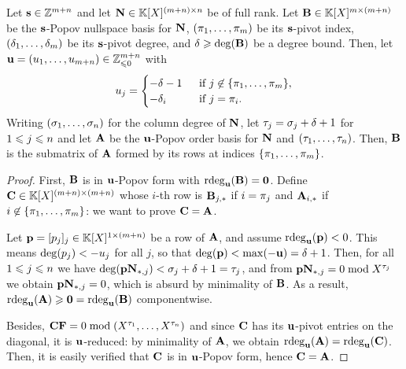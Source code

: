 \documentclass[preprint]{sig-alternate-05-2015}
\begin{document}
\vspace{-0.1cm}
\begin{lem}
  \label{lem:mnb_known_mindeg}
  Let $\shifts \in \shiftSpace[\rdim+\cdim]$ and let $\mat{N} \in
  \polMatSpace[(\rdim+\cdim)][\cdim]$ be of full rank. Let $\mat{B} \in
  \polMatSpace[\rdim][(\rdim+\cdim)]$ be the $\shifts$-Popov nullspace basis
  for $\mat{N}$, $(\piv_1,\ldots,\piv_\rdim)$ be its $\shifts$-pivot index,
  $(\minDeg_1,\ldots,\minDeg_\rdim)$ be its $\shifts$-pivot degree, and
  $\maxDeg \ge \deg(\mat{B})$ be a degree bound. Then, let $\shifts[u] =
  (\shift[u]{1}, \ldots, \shift[u]{\rdim+\cdim}) \in \ZZ_{\le 0}^{\rdim+\cdim}$
  with 
  \vspace{-0.2cm}
  \[ \shift[u]{j} = \begin{cases} 
      -\maxDeg -1 & \;\; \text{if } j \not\in \{\piv_1,\ldots,\piv_\rdim\}, \\ 
      -\minDeg_i & \;\; \text{if } j = \piv_i.
    \end{cases}
  \vspace{-0.2cm}
  \]
  Writing $(\order_1,\ldots,\order_\cdim)$ for the column degree of $\mat{N}$,
  let $\tau_j = \order_j + \maxDeg +1$ for $1 \le j \le \cdim$ and let
  $\mat{A}$ be the $\shifts[u]$-Popov order basis for $\mat{N}$ and
  $(\tau_1,\ldots,\tau_\cdim)$. Then, $\mat{B}$ is the submatrix of $\mat{A}$
  formed by its rows at indices $\{\piv_1,\ldots,\piv_\rdim\}$.
\end{lem}
\begin{proof}
  First, $\mat{B}$ is in $\shifts[u]$-Popov form with
  ${\rdeg[{\shifts[u]}]{\mat{B}} = \unishift}$. Define $\mat{C} \in
  \polMatSpace[(\rdim+\cdim)]$ whose $i$-th row is $\matrow{\mat{B}}{j}$ if $i =
  \piv_j$ and $\matrow{\mat{A}}{i}$ if $i \not\in
  \{\piv_1,\ldots,\piv_\rdim\}$:
  we want to prove $\mat{C} = \mat{A}$.
  
  Let $\row{p} = [p_j]_j \in \polMatSpace[1][(\rdim+\cdim)]$ be a row of
  $\mat{A}$, and assume $\rdeg[{\shifts[u]}]{\row{p}} < 0$.  This means
  $\deg(p_j) < -\shift[u]{j}$ for all $j$, so that $\deg(\row{p}) <
  \max(-\shifts[u]) = \maxDeg+1$. Then, for all $1 \le j\le \cdim$ we have
  $\deg( \row{p} \matcol{\mat{N}}{j} ) < \order_j + \maxDeg +1= \tau_j$, and
  from $\row{p} \matcol{\mat{N}}{j} = 0 \bmod X^{\tau_j}$ we obtain $\row{p}
  \matcol{\mat{N}}{j} = 0$, which is absurd by minimality of $\mat{B}$.  As a
  result, $\rdeg[{\shifts[u]}]{\mat{A}} \ge \unishift =
  \rdeg[{\shifts[u]}]{\mat{B}}$ componentwise.
  
  Besides, $\mat{C} \sys = 0 \bmod (X^{\tau_1},\ldots,X^{\tau_\cdim})$ and
  since $\mat{C}$ has its $\shifts[u]$-pivot entries on the diagonal, it is
  $\shifts[u]$-reduced: by minimality of $\mat{A}$, we obtain
  $\rdeg[{\shifts[u]}]{\mat{A}} = \rdeg[{\shifts[u]}]{\mat{C}}$. Then, it is
  easily verified that $\mat{C}$ is in $\shifts[u]$-Popov form, hence $\mat{C} =
  \mat{A}$.
\end{proof}
\end{document}
